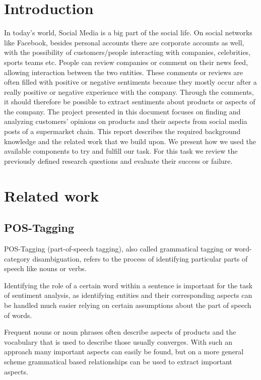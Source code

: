 \documentclass[10pt,a4paper]{article}
\begin{document}
	\section{Introduction}
	In today's world, Social Media is a big part of the social life. On social networks like Facebook, besides personal accounts there are corporate accounts as well, with the possibility of customers/people interacting with companies, celebrities, sports teams etc.
	People can review companies or comment on their news feed, allowing interaction between the two entities. These comments or reviews are often filled with positive or negative sentiments because they mostly occur after a really positive or negative experience with the company. Through the comments, it should therefore be possible to extract sentiments about products or aspects of the company.
	The project presented in this document focuses on finding and analyzing customers' opinions on products and their aspects from social media posts of a supermarket chain. This report describes the required background knowledge and the related work that we build upon. We present how we used the available components to try and fulfill our task. For this task we review the previously defined research questions and evaluate their success or failure.
	
	\section{Related work}
		
		\subsection{POS-Tagging}
		POS-Tagging (part-of-speech tagging), also called grammatical tagging or word-category disambiguation, refers to the process of identifying particular parts of speech like nouns or verbs. 

		Identifying the role of a certain word within a sentence is important for the task of sentiment analysis, as identifying entities and their corresponding aspects can be handled much easier relying on certain assumptions about the part of speech of words.

		Frequent nouns or noun phrases often describe aspects of products and the vocabulary that is used to describe those usually converges. With such an approach many important aspects can easily be found, but on a more general scheme grammatical based relationships can be used to extract important aspects.
\end{document}
